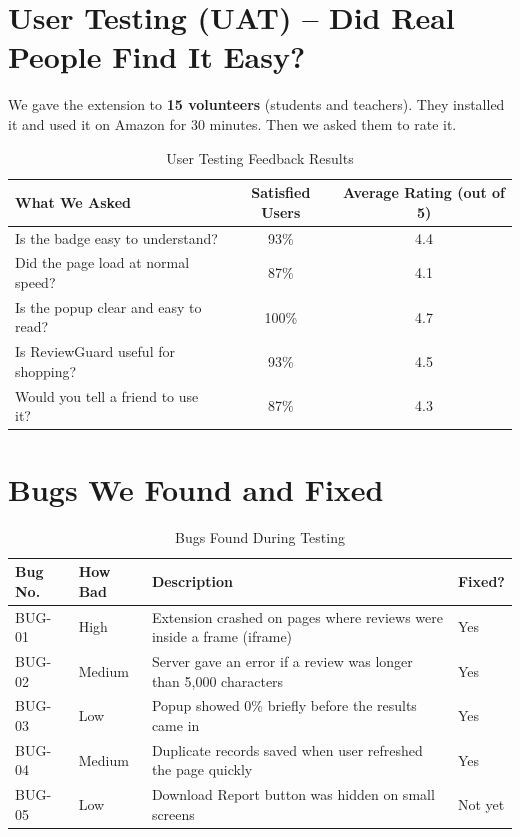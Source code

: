 \documentclass[10pt, a4paper]{report}
\begin{document}
\section{User Testing (UAT) -- Did Real People Find It Easy?}

We gave the extension to \textbf{15 volunteers} (students and teachers). They installed it and used it on Amazon for 30 minutes. Then we asked them to rate it.

\begin{table}[H]
\centering
\caption{User Testing Feedback Results}
\begin{tabular}{lcc}
\toprule
\textbf{What We Asked} & \textbf{Satisfied Users} & \textbf{Average Rating (out of 5)} \\
\midrule
Is the badge easy to understand? & 93\% & 4.4 \\
Did the page load at normal speed? & 87\% & 4.1 \\
Is the popup clear and easy to read? & 100\% & 4.7 \\
Is ReviewGuard useful for shopping? & 93\% & 4.5 \\
Would you tell a friend to use it? & 87\% & 4.3 \\
\bottomrule
\end{tabular}
\end{table}

\section{Bugs We Found and Fixed}

\begin{table}[H]
\centering
\caption{Bugs Found During Testing}
\begin{tabularx}{\textwidth}{llXl}
\toprule
\textbf{Bug No.} & \textbf{How Bad} & \textbf{Description} & \textbf{Fixed?} \\
\midrule
BUG-01 & High & Extension crashed on pages where reviews were inside a frame (iframe) & Yes \\
BUG-02 & Medium & Server gave an error if a review was longer than 5,000 characters & Yes \\
BUG-03 & Low & Popup showed 0\% briefly before the results came in & Yes \\
BUG-04 & Medium & Duplicate records saved when user refreshed the page quickly & Yes \\
BUG-05 & Low & Download Report button was hidden on small screens & Not yet \\
\bottomrule
\end{tabularx}
\end{table}
\end{document}
